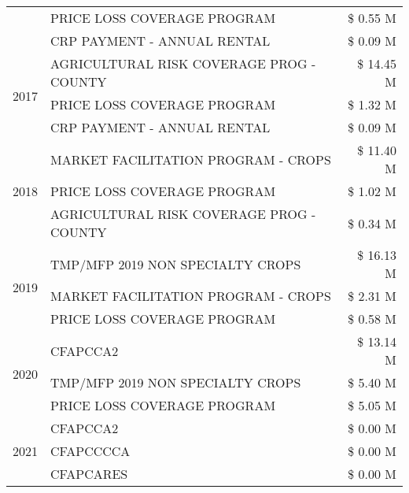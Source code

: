 \begin{tabular}{llr}
 & PRICE LOSS COVERAGE PROGRAM & \$ 0.55 M \\
 & CRP PAYMENT - ANNUAL RENTAL & \$ 0.09 M \\
\cline{1-3}
\multirow[t]{3}{*}{2017} & AGRICULTURAL RISK COVERAGE PROG - COUNTY & \$ 14.45 M \\
 & PRICE LOSS COVERAGE PROGRAM & \$ 1.32 M \\
 & CRP PAYMENT - ANNUAL RENTAL & \$ 0.09 M \\
\cline{1-3}
\multirow[t]{3}{*}{2018} & MARKET FACILITATION PROGRAM - CROPS & \$ 11.40 M \\
 & PRICE LOSS COVERAGE PROGRAM & \$ 1.02 M \\
 & AGRICULTURAL RISK COVERAGE PROG - COUNTY & \$ 0.34 M \\
\cline{1-3}
\multirow[t]{3}{*}{2019} & TMP/MFP 2019 NON SPECIALTY CROPS & \$ 16.13 M \\
 & MARKET FACILITATION PROGRAM - CROPS & \$ 2.31 M \\
 & PRICE LOSS COVERAGE PROGRAM & \$ 0.58 M \\
\cline{1-3}
\multirow[t]{3}{*}{2020} & CFAPCCA2 & \$ 13.14 M \\
 & TMP/MFP 2019 NON SPECIALTY CROPS & \$ 5.40 M \\
 & PRICE LOSS COVERAGE PROGRAM & \$ 5.05 M \\
\cline{1-3}
\multirow[t]{3}{*}{2021} & CFAPCCA2 & \$ 0.00 M \\
 & CFAPCCCCA & \$ 0.00 M \\
 & CFAPCARES & \$ 0.00 M \\
\cline{1-3}
\bottomrule
\end{tabular}
